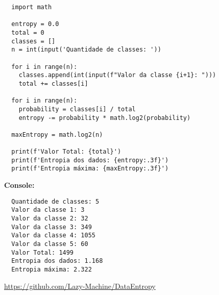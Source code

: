 \documentclass{article}
\begin{document}
\begin{verbatim}
  import math

  entropy = 0.0
  total = 0
  classes = []
  n = int(input('Quantidade de classes: '))

  for i in range(n):
    classes.append(int(input(f"Valor da classe {i+1}: ")))
    total += classes[i]

  for i in range(n):
    probability = classes[i] / total
    entropy -= probability * math.log2(probability)

  maxEntropy = math.log2(n)

  print(f'Valor Total: {total}')
  print(f'Entropia dos dados: {entropy:.3f}')
  print(f'Entropia máxima: {maxEntropy:.3f}')
\end{verbatim}

\textbf{\large Console:}

\begin{verbatim}
  Quantidade de classes: 5
  Valor da classe 1: 3 
  Valor da classe 2: 32
  Valor da classe 3: 349
  Valor da classe 4: 1055
  Valor da classe 5: 60
  Valor Total: 1499
  Entropia dos dados: 1.168
  Entropia máxima: 2.322
\end{verbatim}

\vspace{\fill}

\begin{center}
  \href{https://github.com/Lazy-Machine/DataEntropy}{https://github.com/Lazy-Machine/DataEntropy}
\end{center}
\end{document}
